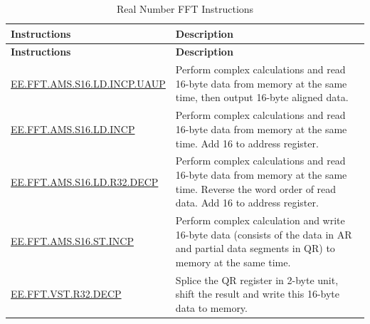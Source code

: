 \begin{longtable}[c]{|l|m{10cm}|}
    \caption{Real Number FFT Instructions}
    \label{tab:pie-real-fft-instructions}\\
    \hline
    \rowcolor{lightgray}
    \textbf{Instructions} & \textbf{Description} \\\hline
    \endfirsthead
    \rowcolor{lightgray}
    \textbf{Instructions} & \textbf{Description} \\\hline
    \endhead
    \endfoot
    
    \hyperref[instruction:EEFFTAMSS16LDINCPUAUP]{EE.FFT.AMS.S16.LD.INCP.UAUP} & Perform complex calculations and read 16-byte data from memory at the same time, then output 16-byte aligned data.
    \\\hline
    \hyperref[instruction:EEFFTAMSS16LDINCP]{EE.FFT.AMS.S16.LD.INCP} & Perform complex calculations and read 16-byte data from memory at the same time. Add 16 to address register.
    \\\hline
    \hyperref[instruction:EEFFTAMSS16LDR32DECP]{EE.FFT.AMS.S16.LD.R32.DECP} & Perform complex calculations and read 16-byte data from memory at the same time. Reverse the word order of read data. Add 16 to address register.
    \\\hline
    \hyperref[instruction:EEFFTAMSS16STINCP]{EE.FFT.AMS.S16.ST.INCP} & Perform complex calculation and write 16-byte data (consists of the data in AR and partial data segments in QR) to memory at the same time.
    \\\hline
    \hyperref[instruction:EEFFTVSTR32DECP]{EE.FFT.VST.R32.DECP} & Splice the QR register in 2-byte unit, shift the result and write this 16-byte data to memory.
    \\\hline
\end{longtable}